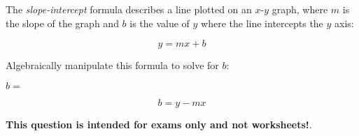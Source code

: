 

The {\it slope-intercept} formula describes a line plotted on an $x$-$y$ graph, where $m$ is the slope of the graph and $b$ is the value of $y$ where the line intercepts the $y$ axis:

$$y = mx + b$$

Algebraically manipulate this formula to solve for $b$:

\vskip 20pt

$b = $







$$b = y - mx$$







{\bf This question is intended for exams only and not worksheets!}.



